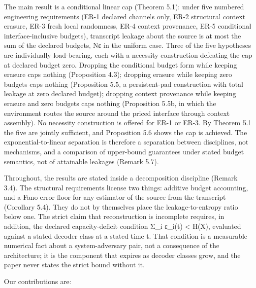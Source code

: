 \documentclass[
  11pt,
]{article}
\begin{document}
The main result is a conditional linear cap (Theorem 5.1): under five
numbered engineering requirements (ER-1 declared channels only, ER-2
structural context erasure, ER-3 fresh local randomness, ER-4 context
provenance, ER-5 conditional interface-inclusive budgets), transcript
leakage about the source is at most the sum of the declared budgets, Nε
in the uniform case. Three of the five hypotheses are individually
load-bearing, each with a necessity construction defeating the cap at
declared budget zero. Dropping the conditional budget form while keeping
erasure caps nothing (Proposition 4.3); dropping erasure while keeping
zero budgets caps nothing (Proposition 5.5, a persistent-pad
construction with total leakage at zero declared budget); dropping
context provenance while keeping erasure and zero budgets caps nothing
(Proposition 5.5b, in which the environment routes the source around the
priced interface through context assembly). No necessity construction is
offered for ER-1 or ER-3. By Theorem 5.1 the five are jointly
sufficient, and Proposition 5.6 shows the cap is achieved. The
exponential-to-linear separation is therefore a separation between
disciplines, not mechanisms, and a comparison of upper-bound guarantees
under stated budget semantics, not of attainable leakages (Remark 5.7).

Throughout, the results are stated inside a decomposition discipline
(Remark 3.4). The structural requirements license two things: additive
budget accounting, and a Fano error floor for any estimator of the
source from the transcript (Corollary 5.4). They do not by themselves
place the leakage-to-entropy ratio below one. The strict claim that
reconstruction is incomplete requires, in addition, the declared
capacity-deficit condition Σ\_i ε\_i(t) \textless{} H(X), evaluated
against a stated decoder class at a stated time t. That condition is a
measurable numerical fact about a system-adversary pair, not a
consequence of the architecture; it is the component that expires as
decoder classes grow, and the paper never states the strict bound
without it.

Our contributions are:
\end{document}
